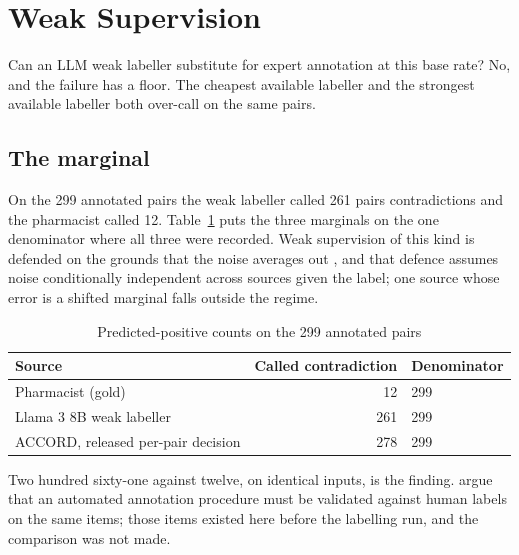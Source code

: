 \section{Weak Supervision}
\label{sec:res-rq2}

Can an LLM weak labeller substitute for expert annotation at this base rate? No,
and the failure has a floor. The cheapest available labeller and the strongest
available labeller both over-call on the same pairs.

\subsection{The marginal}

On the 299 annotated pairs the weak labeller called 261 pairs contradictions and
the pharmacist called 12. Table~\ref{tab:marginal} puts the three marginals on
the one denominator where all three were recorded. Weak supervision of this kind
is defended on the grounds that the noise averages out \citep{ratner2017snorkel},
and that defence assumes noise conditionally independent across sources given the
label; one source whose error is a shifted marginal falls outside the regime.

\begin{table}[H]
\caption{Predicted-positive counts on the 299 annotated pairs}
\centering
\small
\begin{tabular}{lrl}
\toprule
\textbf{Source} & \textbf{Called contradiction} & \textbf{Denominator} \\
\midrule
Pharmacist (gold)                  & 12  & 299 \\
Llama 3 8B weak labeller           & 261 & 299 \\
ACCORD, released per-pair decision & 278 & 299 \\
\bottomrule
\end{tabular}
\label{tab:marginal}
\end{table}

Two hundred sixty-one against twelve, on identical inputs, is the finding.
\citet{pangakis2023validation} argue that an automated annotation procedure must
be validated against human labels on the same items; those items existed here
before the labelling run, and the comparison was not made.

